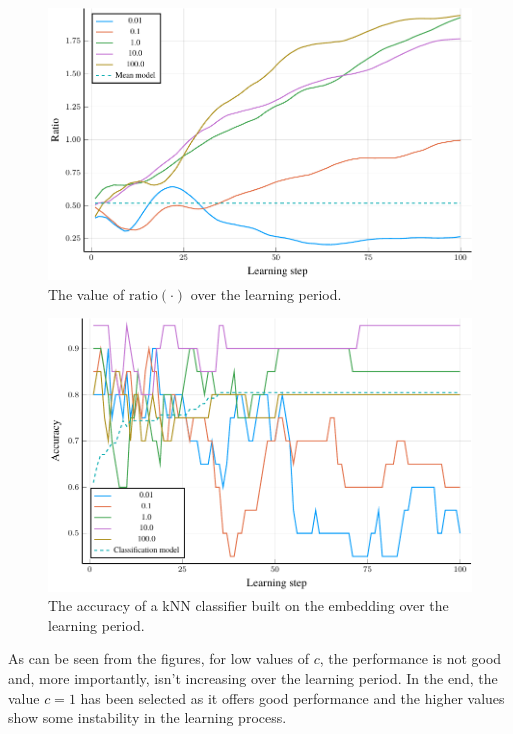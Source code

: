 \begin{figure}[h]
  \centering
  \includegraphics[width=\textwidth]{images/triplet-gridsearch/ratio/triplet-gridsearch-ratio.pdf}
  \caption{The value of \( \mathrm{ratio} \left( \cdot \right) \) over the learning period.}\label{fig:triplet-gridsearch-ratio}
\end{figure}

\begin{figure}[h]
  \centering
  \includegraphics[width=\textwidth]{images/triplet-gridsearch/accuracy/triplet-gridsearch-accuracy.pdf}
  \caption{The accuracy of a kNN classifier built on the embedding over the learning period.}\label{fig:triplet-gridsearch-accuracy}
\end{figure}

As can be seen from the figures, for low values of \( c \), the performance is not good and, more importantly, isn't increasing over the learning period. In the end, the value \( c = 1 \) has been selected as it offers good performance and the higher values show some instability in the learning process.

